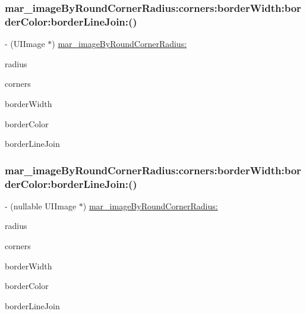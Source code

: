 \subsubsection{\texorpdfstring{mar\+\_\+image\+By\+Round\+Corner\+Radius\+:corners\+:border\+Width\+:border\+Color\+:border\+Line\+Join\+:()}{mar\_imageByRoundCornerRadius:corners:borderWidth:borderColor:borderLineJoin:()}\hspace{0.1cm}{\footnotesize\ttfamily [1/2]}}
{\footnotesize\ttfamily -\/ (U\+I\+Image $\ast$) \hyperlink{category_u_i_image_07_m_a_r_e_x_08_a3928ead790b37d111c1e1c059c302211}{mar\+\_\+image\+By\+Round\+Corner\+Radius\+:} \begin{DoxyParamCaption}\item[{(C\+G\+Float)}]{radius }\item[{corners:(U\+I\+Rect\+Corner)}]{corners }\item[{borderWidth:(C\+G\+Float)}]{border\+Width }\item[{borderColor:(U\+I\+Color $\ast$)}]{border\+Color }\item[{borderLineJoin:(C\+G\+Line\+Join)}]{border\+Line\+Join }\end{DoxyParamCaption}\hspace{0.3cm}{\ttfamily [implementation]}}

\mbox{\label{category_u_i_image_07_m_a_r_e_x_08_a847a973c83e4efef140840e811993eff}} 
\subsubsection{\texorpdfstring{mar\+\_\+image\+By\+Round\+Corner\+Radius\+:corners\+:border\+Width\+:border\+Color\+:border\+Line\+Join\+:()}{mar\_imageByRoundCornerRadius:corners:borderWidth:borderColor:borderLineJoin:()}\hspace{0.1cm}{\footnotesize\ttfamily [2/2]}}
{\footnotesize\ttfamily -\/ (nullable U\+I\+Image $\ast$) \hyperlink{category_u_i_image_07_m_a_r_e_x_08_a3928ead790b37d111c1e1c059c302211}{mar\+\_\+image\+By\+Round\+Corner\+Radius\+:} \begin{DoxyParamCaption}\item[{(C\+G\+Float)}]{radius }\item[{corners:(U\+I\+Rect\+Corner)}]{corners }\item[{borderWidth:(C\+G\+Float)}]{border\+Width }\item[{borderColor:(nullable U\+I\+Color $\ast$)}]{border\+Color }\item[{borderLineJoin:(C\+G\+Line\+Join)}]{border\+Line\+Join }\end{DoxyParamCaption}}

